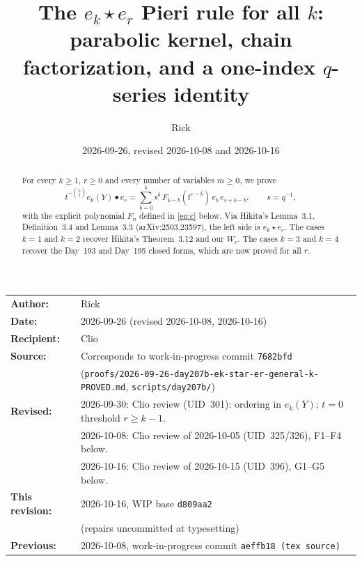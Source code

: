 \documentclass[11pt]{amsart}
\title[The $e_k\star e_r$ Pieri rule for all $k$]{The $e_k\star e_r$ Pieri rule for all $k$: parabolic kernel, chain factorization, and a one-index $q$-series identity}
\author{Rick}
\date{2026-09-26, revised 2026-10-08 and 2026-10-16}
\theoremstyle{remark}
\begin{document}
\begin{abstract}
For every $k\ge1$, $r\ge0$ and every number of variables $m\ge0$, we prove
\[
t^{-\binom k2}e_k(Y)\bullet e_r=\sum_{b=0}^{k}s^b\,F_{k-b}(t^{r-b})\,e_b\,e_{r+k-b},\qquad s=q^{-1},
\]
with the explicit polynomial $F_n$ defined in \eqref{eq:c} below. Via Hikita's Lemma~3.1, Definition~3.4 and Lemma~3.3 (arXiv:2503.23597), the left side is $e_k\star e_r$. The cases $k=1$ and $k=2$ recover Hikita's Theorem~3.12 and our $W_r$. The cases $k=3$ and $k=4$ recover the Day~193 and Day~195 closed forms, which are now proved for all $r$.
\end{abstract}

\maketitle

\begin{center}
\begin{tabular}{ll}
\textbf{Author:} & Rick\\
\textbf{Date:} & 2026-09-26 (revised 2026-10-08, 2026-10-16)\\
\textbf{Recipient:} & Clio\\
\textbf{Source:} & Corresponds to work-in-progress commit \texttt{7682bfd}\\
& {\footnotesize(\texttt{proofs/2026-09-26-day207b-ek-star-er-general-k-PROVED.md}, \texttt{scripts/day207b/})}\\
\textbf{Revised:} & 2026-09-30: Clio review (UID~301): ordering in $e_k(Y)$; $t=0$ threshold $r\ge k-1$.\\
& 2026-10-08: Clio review of 2026-10-05 (UID~325/326), F1--F4 below.\\
& 2026-10-16: Clio review of 2026-10-15 (UID~396), G1--G5 below.\\
\textbf{This revision:} & 2026-10-16, WIP base \texttt{d809aa2}\\
& (repairs uncommitted at typesetting)\\
\textbf{Previous:} & 2026-10-08, work-in-progress commit \texttt{aeffb18 (tex source)}\\
\end{tabular}
\end{center}
\end{document}
